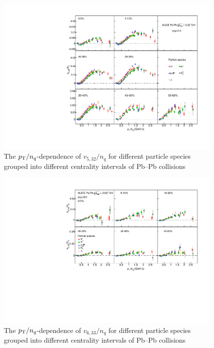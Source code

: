 \begin{figure}[!htb]
\begin{center}
\includegraphics[scale=0.82]{figures/scaling/All_v523_gap00_NCQ_3by3.pdf}

\end{center}
\caption{The $p_{\rm{T}}/n_{q}$-dependence of $v_{5,32}/n_{q}$ for different particle species grouped into different centrality intervals of Pb--Pb collisions \sNN}
\label{v523_NCQ}
\end{figure}

\begin{figure}[!htb]
\begin{center}
\includegraphics[scale=0.82]{figures/scaling/All_v633_gap00_NCQ_3by2.pdf}
\end{center}
\caption{The $p_{\rm{T}}/n_{q}$-dependence of $v_{6,33}/n_{q}$ for different particle species grouped into different centrality intervals of Pb--Pb collisions \sNN}
\label{v633_NCQ}
\end{figure}

